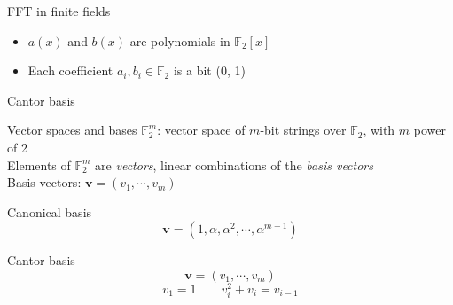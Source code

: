 \begin{frame}{FFT in finite fields}
    \begin{block}{}
        \begin{itemize}
            \item $a(x)$ and $b(x)$ are polynomials in $\mathds{F}_2[x]$
            \item Each coefficient $a_i, b_i \in \mathds{F}_2$ is a bit (0, 1)
        \end{itemize}
    \end{block}

    \begin{block}{}
    \end{block}
\end{frame}

\begin{frame}{Cantor basis}
    \begin{block}{Vector spaces and bases}
        $\mathds{F}_2^m$: vector space of $m$-bit strings over $\mathds{F}_2$, with $m$ power of 2\\
        Elements of $\mathds{F}_2^m$ are \emph{vectors}, linear combinations of the \emph{basis vectors}\\
        Basis vectors: $\mathbf{v} = (v_1, \cdots, v_m)$
    \end{block}
    \begin{block}{Canonical basis}
        \begin{equation*}
            \mathbf{v}=(1, \alpha, \alpha^2, \cdots, \alpha^{m-1})
        \end{equation*}
    \end{block}

    \begin{block}{Cantor basis}
        \begin{equation*}
            \mathbf{v} = (v_1, \cdots, v_m)
        \end{equation*}
        \begin{equation*}
            v_1 = 1 \qquad v_i^2+v_i = v_{i-1}
        \end{equation*}
    \end{block}
\end{frame}

